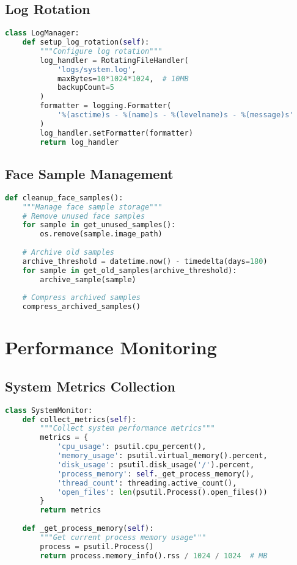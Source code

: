 \subsection{Log Rotation}
\begin{lstlisting}[language=Python]
class LogManager:
    def setup_log_rotation(self):
        """Configure log rotation"""
        log_handler = RotatingFileHandler(
            'logs/system.log',
            maxBytes=10*1024*1024,  # 10MB
            backupCount=5
        )
        formatter = logging.Formatter(
            '%(asctime)s - %(name)s - %(levelname)s - %(message)s'
        )
        log_handler.setFormatter(formatter)
        return log_handler
\end{lstlisting}

\subsection{Face Sample Management}
\begin{lstlisting}[language=Python]
def cleanup_face_samples():
    """Manage face sample storage"""
    # Remove unused face samples
    for sample in get_unused_samples():
        os.remove(sample.image_path)
        
    # Archive old samples
    archive_threshold = datetime.now() - timedelta(days=180)
    for sample in get_old_samples(archive_threshold):
        archive_sample(sample)
        
    # Compress archived samples
    compress_archived_samples()
\end{lstlisting}

\section{Performance Monitoring}

\subsection{System Metrics Collection}
\begin{lstlisting}[language=Python]
class SystemMonitor:
    def collect_metrics(self):
        """Collect system performance metrics"""
        metrics = {
            'cpu_usage': psutil.cpu_percent(),
            'memory_usage': psutil.virtual_memory().percent,
            'disk_usage': psutil.disk_usage('/').percent,
            'process_memory': self._get_process_memory(),
            'thread_count': threading.active_count(),
            'open_files': len(psutil.Process().open_files())
        }
        return metrics
        
    def _get_process_memory(self):
        """Get current process memory usage"""
        process = psutil.Process()
        return process.memory_info().rss / 1024 / 1024  # MB
\end{lstlisting}

